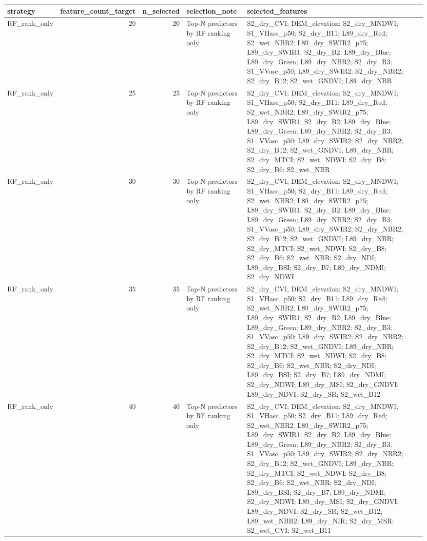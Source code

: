 \begin{tabular}{lrrll}
\toprule
strategy & feature_count_target & n_selected & selection_note & selected_features \\
\midrule
RF_rank_only & 20 & 20 & Top-N predictors by RF ranking only & S2_dry_CVI; DEM_elevation; S2_dry_MNDWI; S1_VHasc_p50; S2_dry_B11; L89_dry_Red; S2_wet_NBR2; L89_dry_SWIR2_p75; L89_dry_SWIR1; S2_dry_B2; L89_dry_Blue; L89_dry_Green; L89_dry_NBR2; S2_dry_B3; S1_VVasc_p50; L89_dry_SWIR2; S2_dry_NBR2; S2_dry_B12; S2_wet_GNDVI; L89_dry_NBR \\
RF_rank_only & 25 & 25 & Top-N predictors by RF ranking only & S2_dry_CVI; DEM_elevation; S2_dry_MNDWI; S1_VHasc_p50; S2_dry_B11; L89_dry_Red; S2_wet_NBR2; L89_dry_SWIR2_p75; L89_dry_SWIR1; S2_dry_B2; L89_dry_Blue; L89_dry_Green; L89_dry_NBR2; S2_dry_B3; S1_VVasc_p50; L89_dry_SWIR2; S2_dry_NBR2; S2_dry_B12; S2_wet_GNDVI; L89_dry_NBR; S2_dry_MTCI; S2_wet_NDWI; S2_dry_B8; S2_dry_B6; S2_wet_NBR \\
RF_rank_only & 30 & 30 & Top-N predictors by RF ranking only & S2_dry_CVI; DEM_elevation; S2_dry_MNDWI; S1_VHasc_p50; S2_dry_B11; L89_dry_Red; S2_wet_NBR2; L89_dry_SWIR2_p75; L89_dry_SWIR1; S2_dry_B2; L89_dry_Blue; L89_dry_Green; L89_dry_NBR2; S2_dry_B3; S1_VVasc_p50; L89_dry_SWIR2; S2_dry_NBR2; S2_dry_B12; S2_wet_GNDVI; L89_dry_NBR; S2_dry_MTCI; S2_wet_NDWI; S2_dry_B8; S2_dry_B6; S2_wet_NBR; S2_dry_NDI; L89_dry_BSI; S2_dry_B7; L89_dry_NDMI; S2_dry_NDWI \\
RF_rank_only & 35 & 35 & Top-N predictors by RF ranking only & S2_dry_CVI; DEM_elevation; S2_dry_MNDWI; S1_VHasc_p50; S2_dry_B11; L89_dry_Red; S2_wet_NBR2; L89_dry_SWIR2_p75; L89_dry_SWIR1; S2_dry_B2; L89_dry_Blue; L89_dry_Green; L89_dry_NBR2; S2_dry_B3; S1_VVasc_p50; L89_dry_SWIR2; S2_dry_NBR2; S2_dry_B12; S2_wet_GNDVI; L89_dry_NBR; S2_dry_MTCI; S2_wet_NDWI; S2_dry_B8; S2_dry_B6; S2_wet_NBR; S2_dry_NDI; L89_dry_BSI; S2_dry_B7; L89_dry_NDMI; S2_dry_NDWI; L89_dry_MSI; S2_dry_GNDVI; L89_dry_NDVI; S2_dry_SR; S2_wet_B12 \\
RF_rank_only & 40 & 40 & Top-N predictors by RF ranking only & S2_dry_CVI; DEM_elevation; S2_dry_MNDWI; S1_VHasc_p50; S2_dry_B11; L89_dry_Red; S2_wet_NBR2; L89_dry_SWIR2_p75; L89_dry_SWIR1; S2_dry_B2; L89_dry_Blue; L89_dry_Green; L89_dry_NBR2; S2_dry_B3; S1_VVasc_p50; L89_dry_SWIR2; S2_dry_NBR2; S2_dry_B12; S2_wet_GNDVI; L89_dry_NBR; S2_dry_MTCI; S2_wet_NDWI; S2_dry_B8; S2_dry_B6; S2_wet_NBR; S2_dry_NDI; L89_dry_BSI; S2_dry_B7; L89_dry_NDMI; S2_dry_NDWI; L89_dry_MSI; S2_dry_GNDVI; L89_dry_NDVI; S2_dry_SR; S2_wet_B12; L89_wet_NBR2; L89_dry_NIR; S2_dry_MSR; S2_wet_CVI; S2_wet_B11 \\

\end{tabular}
